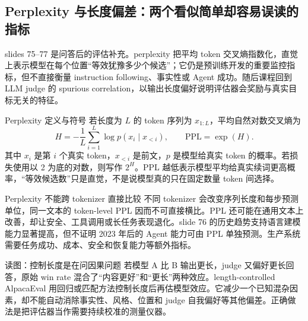 \subsection{Perplexity 与长度偏差：两个看似简单却容易误读的指标}

slides 75--77 是问答后的评估补充。perplexity 把平均 token 交叉熵指数化，直觉上表示模型在每个位置“等效犹豫多少个候选”；它仍是预训练开发的重要监控指标，但不直接衡量 instruction following、事实性或 Agent 成功。随后课程回到 LLM judge 的 spurious correlation，以输出长度偏好说明评估器会奖励与真实目标无关的特征。


\begin{importantbox}{Perplexity 定义与符号}
若长度为 $L$ 的 token 序列为 $x_{1:L}$，平均自然对数交叉熵为
\[
H=-\frac{1}{L}\sum_{i=1}^{L}\log p(x_i\mid x_{<i}),
\qquad \mathrm{PPL}=\exp(H).
\]
其中 $x_i$ 是第 $i$ 个真实 token，$x_{<i}$ 是前文，$p$ 是模型给真实 token 的概率。若损失使用以 2 为底的对数，则写作 $2^H$。PPL 越低表示模型平均给真实续词更高概率，“等效候选数”只是直觉，不是说模型真的只在固定数量 token 间选择。
\end{importantbox}

\begin{warningbox}{Perplexity 不能跨 tokenizer 直接比较}
不同 tokenizer 会改变序列长度和每步预测单位，同一文本的 token-level PPL 因而不可直接横比。PPL 还可能在通用文本上改善，却让安全、工具调用或长任务表现退化。slide 76 的历史趋势支持语言建模能力显著提高，但不证明 2023 年后的 Agent 能力可由 PPL 单独预测。生产系统需要任务成功、成本、安全和恢复能力等额外指标。
\end{warningbox}

\begin{knowledgebox}{读图：控制长度是在问因果问题}
若模型 A 比 B 输出更长，judge 又偏好更长回答，原始 win rate 混合了“内容更好”和“更长”两种效应。length-controlled AlpacaEval 用回归或匹配方法控制长度后再估模型效应。它减少一个已知混杂因素，却不能自动消除事实性、风格、位置和 judge 自我偏好等其他偏差。正确做法是把评估器当作需要持续校准的测量仪器。
\end{knowledgebox}

